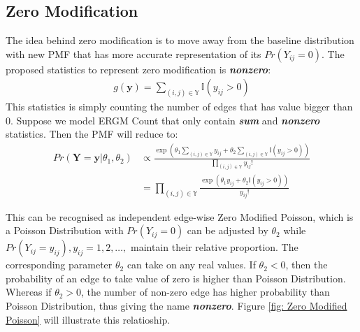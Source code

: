 \documentclass[12pt,a4paper,twoside,openany]{book}\usepackage[]{graphicx}\usepackage[]{color}
\newcommand{\BI}[1]{\textit{\textbf{#1}}}
\begin{document}
\subsection{Zero Modification}
The idea behind zero modification is to move away from the baseline distribution with new PMF that has more accurate representation of its $Pr(Y_{ij}=0)$. 
The proposed statistics to represent zero modification is \BI{nonzero}:
\begin{align}
g(\bm{y}) = \sum_{(i,j) \in \mathbb{Y}} \mathbb{I}(y_{ij} > 0)
\end{align}
This statistics is simply counting the number of edges that has value bigger than 0. 
Suppose we model ERGM Count that only contain \BI{sum} and \BI{nonzero} statistics. 
Then the PMF will reduce to:
\begin{align*}
Pr(\bm{Y}=\bm{y}|\theta_1,\theta_2) &\propto \frac{\exp\left(\theta_1 \sum_{(i,j) \in \mathbb{Y}} y_{ij} + \theta_2 \sum_{(i,j) \in \mathbb{Y}} \mathbb{I}(y_{ij} > 0)\right)}{\prod_{(i,j) \in \mathbb{Y}}y_{ij}!}\\
&=\prod_{(i,j) \in \mathbb{Y}} \frac{\exp \left(\theta_1 y_{ij} + \theta_2 \mathbb{I}(y_{ij} > 0)\right)}{y_{ij}!}
\end{align*}

This can be recognised as independent edge-wise Zero Modified Poisson, which is a Poisson Distribution with $Pr(Y_{ij}=0)$ can be adjusted by $\theta_2$ while $Pr(Y_{ij}=y_{ij}), y_{ij}=1,2,\ldots,$ maintain their relative proportion.
The corresponding parameter $\theta_2$ can take on any real values. 
If $\theta_2 <0$, then the probability of an edge to take value of zero is higher than Poisson Distribution. 
Whereas if $\theta_2>0$, the number of non-zero edge has higher probability than Poisson Distribution, thus giving the name \textit{\textbf{nonzero}}. Figure \ref{fig: Zero Modified Poisson} will illustrate this relatioship.
\end{document}
